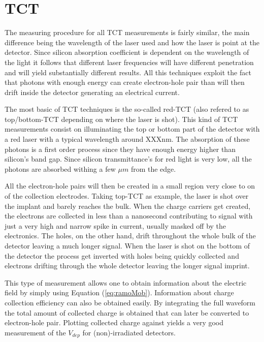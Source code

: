 \section{TCT} %
\label{sec:experimental_method}

The measuring procedure for all TCT measurements is fairly similar, the main difference being the wavelength of the laser used and how the laser is point at the detector. Since silicon absorption coefficient is dependent on the wavelength of the light it follows that different laser frequencies will have different penetration and will yield substantially different results. All this techniques exploit the fact that photons with enough energy can create electron-hole pair than will then drift inside the detector generating an electrical current. 

The most basic of TCT techniques is the so-called red-TCT (also refered to as top/bottom-TCT depending on where the laser is shot). This kind of TCT measurements consist on illuminating the top or bottom part of the detector with a red laser with a typical wavelength around XXXnm. The absorption of these photons is a first order process since they have enough energy higher than silicon's band gap. Since silicon transmittance's for red light is very low, all the photons are absorbed withing a few $\mu m$ from the edge. 

All the electron-hole pairs will then be created in a small region very close to on of the collection electrodes. Taking top-TCT as example, the laser is shot over the implant and barely reaches the bulk. When the charge carriers get created, the electrons are collected in less than a nanosecond contributing to signal with just a very high and narrow spike in current, usually masked off by the electronics. The holes, on the other hand, drift throughout the whole bulk of the detector leaving a much longer signal. When the laser is shot on the bottom of the detector the process get inverted with holes being quickly collected and electrons drifting through the whole detector leaving the longer signal imprint.

This type of measurement allows one to obtain information about the electric field by simply using Equation (\ref{eq:ramoMob}). Information about charge collection efficiency can also be obtained easily. By integrating the full waveform the total amount of collected charge is obtained that can later be converted to electron-hole pair. Plotting collected charge against \vias yields a very good measurement of the $V_{dep}$ for (non)-irradiated detectors. 

